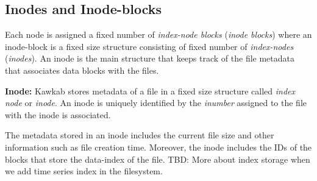 \documentclass[]{article}
\newcommand{\subtopic}[1]{\vspace{1.5pt} \noindent \textbf{#1}}
\newcommand{\hl}[1]{\textcolor{hlcolor}{#1}}
\begin{document}
\subsection{Inodes and Inode-blocks} 

Each node is assigned a fixed number of \textit{index-node blocks}
(\textit{inode blocks})  where an inode-block is a fixed size structure
consisting of fixed number of \textit{index-nodes} (\textit{inodes}).  An inode
is the main structure that keeps track of the file metadata that associates
data blocks with the files.


\subtopic{Inode:} Kawkab stores metadata of a file in a fixed size structure
called \textit{index node} or \textit{inode}. An inode is uniquely identified by
the \textit{inumber} assigned to the file with the inode is associated.

The metadata stored in an inode includes the current file size and other
information such as file creation time. Moreover, the inode includes
the IDs of the blocks that store the data-index of the file.
\hl{TBD: More about index storage when we add time series index in the
filesystem.}


%
%
%
%
%
\end{document}
